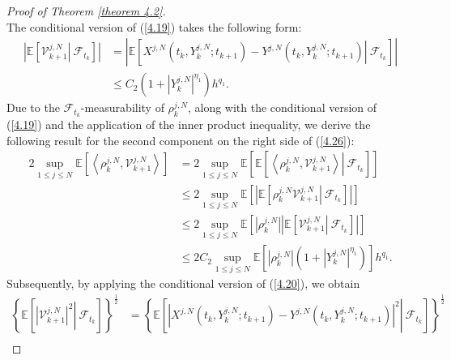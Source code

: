 \documentclass[12pt]{article}
\numberwithin{equation}{section}
\begin{document}
\begin{proof}[ Proof of Theorem \ref{theorem 4.2}]
\begin{equation}
\end{equation}
The conditional version of (\ref{4.19}) takes the following form:
\begin{equation}\tag{5.41}\label{4.28}
\begin{aligned}
 \left|\mathbb{E} \left[\left.\mathcal{V}^{j,N} _{k+1}\right\rvert\ \mathcal{F} _{t_k} \right]\right|&=\left|\mathbb{E} \left[\left. X^{j,N}\left( t_k,Y_{k}^{j,N};t_{k+1} \right) -Y^{j,N}\left( t_k,Y_{k}^{j,N};t_{k+1} \right) \right\rvert\ \mathcal{F} _{t_k} \right]\right|\\
 &\leq C_2 \left( 1+\left|Y_{k}^{j,N}\right|^{\eta _1} \right)  h^{q_1}.
 \end{aligned}
\end{equation}
Due to the $\mathcal{F}_{t_k}$-measurability of $\rho^{j,N}_k$, along with the conditional version of (\ref{4.19}) and the application of the inner product inequality, we derive the following result for the second component on the right side of (\ref{4.26}):
\begin{equation}\tag{5.42}\label{4.29}
\begin{aligned}
2\underset{1\leqslant j\leqslant N}{\sup}\mathbb{E} \left[ \left \langle \rho^{j,N} _k,\mathcal{V}^{j,N} _{k+1} \right \rangle \right] 
&= 2\underset{1\leqslant j\leqslant N}{\sup}\mathbb{E} \left[ \mathbb{E} \left[\left. \left\langle \rho^{j,N} _k,\mathcal{V}^{j,N} _{k+1} \right \rangle \right\rvert\ \mathcal{F} _{t_k} \right] \right]\\
&\leq 2\underset{1\leqslant j\leqslant N}{\sup}\mathbb{E} \left[ \left |\mathbb{E} \left[ \left.\rho^{j,N} _k\mathcal{V}^{j,N} _{k+1}\right\rvert\ \mathcal{F} _{t_k} \right] \right|\right] \\
&\leq 2\underset{1\leqslant j\leqslant N}{\sup}\mathbb{E} \left[\left|\rho ^{j,N}_k\right|\left| \mathbb{E} \left[\left. \mathcal{V}^{j,N} _{k+1}\right\rvert\ \mathcal{F} _{t_k} \right]\right |\right] \\
&\leq 2C_2\underset{1\leqslant j\leqslant N}{\sup}\mathbb{E} \left[ \left| \rho^{j,N} _k \right|\left( 1+\left| Y_{k}^{j,N} \right|^{\eta_1} \right) \right] h^{q_1}.
\end{aligned}
\end{equation}
Subsequently, by applying the conditional version of (\ref{4.20}), we obtain 
\begin{equation}\tag{5.43}\label{4.30}
\begin{aligned}
\left\{ \mathbb{E} \left[\left. \left|\mathcal{V}^{j,N} _{k+1} \right|^2\right\rvert\ \mathcal{F} _{t_k} \right] \right\} ^{\frac{1}{2}}&=\left\{ \mathbb{E} \left[ \left.\left| X^{j,N}\left( t_k,Y_{k}^{j,N};t_{k+1} \right) -Y^{j,N}\left( t_k,Y_{k}^{j,N};t_{k+1} \right) \right|^2\right\rvert\ \mathcal{F} _{t_k} \right] \right\} ^{\frac{1}{2}}\\

\end{aligned}
\end{equation}
\end{proof}
\end{document}
